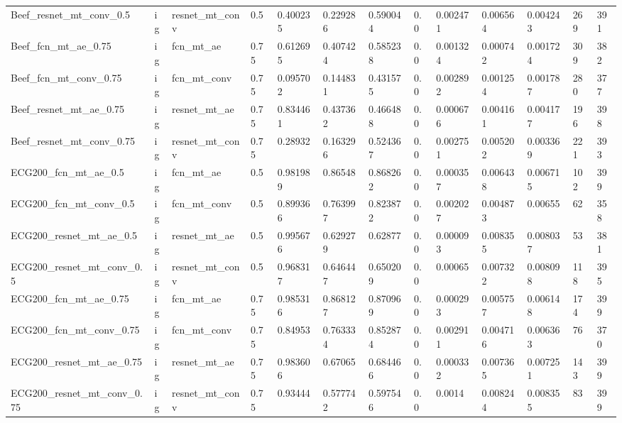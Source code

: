 \begin{tabular}{lllllllllllll}
Beef\_resnet\_mt\_conv\_0.5      &  ig &  resnet\_mt\_conv &   0.5 &  0.400235 &  0.229286 &  0.590044 &  0.0 &  0.002471 &  0.006564 &  0.004243 &          269 &          391 \\
Beef\_fcn\_mt\_ae\_0.75          &  ig &       fcn\_mt\_ae &  0.75 &  0.612695 &  0.407424 &  0.585238 &  0.0 &  0.001324 &  0.000742 &  0.001724 &          309 &          382 \\
Beef\_fcn\_mt\_conv\_0.75        &  ig &     fcn\_mt\_conv &  0.75 &  0.095702 &  0.144831 &  0.431575 &  0.0 &  0.002892 &  0.001254 &  0.001787 &          280 &          377 \\
Beef\_resnet\_mt\_ae\_0.75       &  ig &    resnet\_mt\_ae &  0.75 &  0.834461 &  0.437362 &  0.466488 &  0.0 &  0.000676 &  0.004161 &  0.004177 &          196 &          398 \\
Beef\_resnet\_mt\_conv\_0.75     &  ig &  resnet\_mt\_conv &  0.75 &   0.28932 &  0.163296 &  0.524367 &  0.0 &  0.002751 &  0.005202 &  0.003369 &          221 &          393 \\
ECG200\_fcn\_mt\_ae\_0.5         &  ig &       fcn\_mt\_ae &   0.5 &  0.981989 &   0.86548 &  0.868262 &  0.0 &  0.000357 &  0.006438 &  0.006715 &          102 &          399 \\
ECG200\_fcn\_mt\_conv\_0.5       &  ig &     fcn\_mt\_conv &   0.5 &  0.899366 &  0.763997 &  0.823872 &  0.0 &  0.002027 &  0.004873 &   0.00655 &           62 &          358 \\
ECG200\_resnet\_mt\_ae\_0.5      &  ig &    resnet\_mt\_ae &   0.5 &  0.995676 &  0.629279 &   0.62877 &  0.0 &  0.000093 &  0.008355 &  0.008037 &           53 &          381 \\
ECG200\_resnet\_mt\_conv\_0.5    &  ig &  resnet\_mt\_conv &   0.5 &  0.968317 &  0.646447 &  0.650209 &  0.0 &   0.00065 &  0.007322 &  0.008098 &          118 &          395 \\
ECG200\_fcn\_mt\_ae\_0.75        &  ig &       fcn\_mt\_ae &  0.75 &  0.985316 &  0.868127 &  0.870969 &  0.0 &  0.000293 &  0.005757 &  0.006148 &          174 &          399 \\
ECG200\_fcn\_mt\_conv\_0.75      &  ig &     fcn\_mt\_conv &  0.75 &   0.84953 &  0.763334 &  0.852874 &  0.0 &  0.002911 &  0.004716 &  0.006363 &           76 &          370 \\
ECG200\_resnet\_mt\_ae\_0.75     &  ig &    resnet\_mt\_ae &  0.75 &  0.983606 &   0.67065 &  0.684466 &  0.0 &  0.000332 &  0.007365 &  0.007251 &          143 &          399 \\
ECG200\_resnet\_mt\_conv\_0.75   &  ig &  resnet\_mt\_conv &  0.75 &   0.93444 &  0.577742 &  0.597546 &  0.0 &    0.0014 &  0.008244 &  0.008355 &           83 &          399 \\
\bottomrule
\end{tabular}
